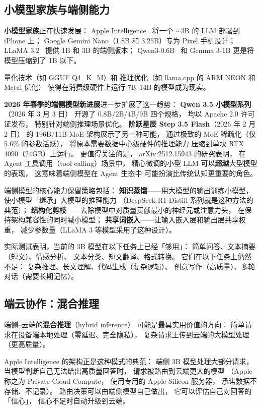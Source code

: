 \subsection{小模型家族与端侧能力}

\textbf{小模型家族}正在快速发展：
Apple Intelligence~\cite{gunter2024appleintelligence}
将一个 $\sim$3B 的 LLM 部署到 iPhone 上；
Google Gemini Nano（1.8B 和 3.25B）专为 Pixel 手机设计；
LLaMA 3.2~\cite{dubey2024llama3} 提供 1B 和 3B 的端侧版本；
Qwen3-0.6B~\cite{qwen2025qwen3} 和 Gemma 3-1B
更是将模型压缩到了 1B 以下。

量化技术（如 GGUF Q4\_K\_M）和
推理优化（如 llama.cpp 的 ARM NEON 和 Metal 优化）
使得在消费级硬件上运行 7B--14B 的模型成为现实。

\textbf{2026 年春季的端侧模型新进展}进一步扩展了这一趋势：
\textbf{Qwen 3.5 小模型系列}（2026 年 3 月 3 日）
开源了 0.8B/2B/4B/9B 四个规格，
均以 Apache 2.0 许可证发布，
特别针对端侧推理场景优化。
\textbf{阶跃星辰 Step 3.5 Flash}（2026 年 2 月 2 日）
的 196B/11B MoE 架构展示了另一种可能，
通过极致的 MoE 稀疏化（仅 5.6\% 的参数活跃），
将原本需要数据中心级硬件的推理能力
压缩到单块 RTX 4090（24GB）上运行。
更值得关注的是，
arXiv:2512.15943 的研究表明，
在 Agent 工具调用（tool calling）场景中，
精心微调的小型 LLM 可以\textbf{超越}大型模型的表现，
这意味着端侧模型在 Agent 生态中
可能扮演比传统认知更重要的角色。

端侧模型的核心能力保留策略包括：
\textbf{知识蒸馏}——用大模型的输出训练小模型，
使小模型「继承」大模型的推理能力
（DeepSeek-R1-Distill 系列就是这种方法的典范）；
\textbf{结构化剪枝}——去除模型中对质量贡献最小的神经元或注意力头，
在保持架构兼容性的同时减小模型；
\textbf{共享词嵌入}——让输入嵌入层和输出层共享权重，
减少参数量（LLaMA 3 等模型采用了这种设计）。

实际测试表明，当前的 3B 模型在以下任务上已经「够用」：
简单问答、文本摘要（短文）、情感分析、
文本分类、短文翻译、格式转换。
它们在以下任务上仍然不足：
复杂推理、长文理解、代码生成（复杂逻辑）、
创意写作（高质量）、多轮对话（需要长期记忆）。

\subsection{端云协作：混合推理}

端侧--云端的\textbf{混合推理}（hybrid inference）
可能是最具实用价值的方向：
简单请求在设备端本地处理（零延迟、完全隐私），
复杂请求上传到云端的大模型处理（更高质量）。

Apple Intelligence 的架构正是这种模式的典范：
端侧 3B 模型处理大部分请求，
当模型判断自己无法给出高质量回答时，
请求被路由到云端更大的模型
（Apple 称之为 Private Cloud Compute，
使用专用的 Apple Silicon 服务器，
承诺数据不存储、不记录）。
路由决策可以由端侧模型自己做出，
它可以评估自己对回答的「信心」，
信心不足时自动升级到云端。

